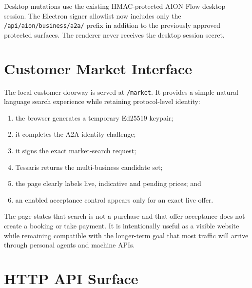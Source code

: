 \documentclass[11pt,a4paper]{article}
\newcommand{\code}[1]{\texttt{#1}}
\begin{document}
Desktop mutations use the existing HMAC-protected AION Flow desktop session.
The Electron signer allowlist now includes only the
\code{/api/aion/business/a2a/} prefix in addition to the previously approved
protected surfaces.  The renderer never receives the desktop session secret.

\section{Customer Market Interface}

The local customer doorway is served at \code{/market}.  It provides a simple
natural-language search experience while retaining protocol-level identity:

\begin{enumerate}
  \item the browser generates a temporary Ed25519 keypair;
  \item it completes the A2A identity challenge;
  \item it signs the exact market-search request;
  \item Tessaris returns the multi-business candidate set;
  \item the page clearly labels live, indicative and pending prices; and
  \item an enabled acceptance control appears only for an exact live offer.
\end{enumerate}

The page states that search is not a purchase and that offer acceptance does
not create a booking or take payment.  It is intentionally useful as a visible
website while remaining compatible with the longer-term goal that most traffic
will arrive through personal agents and machine APIs.

\section{HTTP API Surface}
\end{document}
